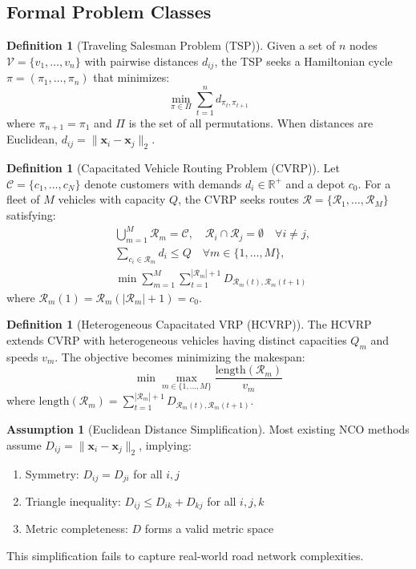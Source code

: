 \documentclass[journal,twoside,web]{ieeecolor}
\theoremstyle{definition}
\newtheorem{definition}[theorem]{Definition}
\theoremstyle{remark}
\theoremstyle{definition}
\newtheorem{assumption}[theorem]{Assumption}
\begin{document}
\subsection{Formal Problem Classes}

\begin{definition}[Traveling Salesman Problem (TSP)]
Given a set of $n$ nodes $\mathcal{V} = \{v_1, \ldots, v_n\}$ with pairwise distances $d_{ij}$, the TSP seeks a Hamiltonian cycle $\pi = (\pi_1, \ldots, \pi_n)$ that minimizes:
\begin{equation}
\min_{\pi \in \Pi} \sum_{t=1}^{n} d_{\pi_t, \pi_{t+1}}
\end{equation}
where $\pi_{n+1} = \pi_1$ and $\Pi$ is the set of all permutations. When distances are Euclidean, $d_{ij} = \|\mathbf{x}_i - \mathbf{x}_j\|_2$.
\end{definition}

\begin{definition}[Capacitated Vehicle Routing Problem (CVRP)]
Let $\mathcal{C} = \{c_1, \ldots, c_N\}$ denote customers with demands $d_i \in \mathbb{R}^+$ and a depot $c_0$. For a fleet of $M$ vehicles with capacity $Q$, the CVRP seeks routes $\mathcal{R} = \{\mathcal{R}_1, \ldots, \mathcal{R}_M\}$ satisfying:
\begin{align}
&\bigcup_{m=1}^M \mathcal{R}_m = \mathcal{C}, \quad \mathcal{R}_i \cap \mathcal{R}_j = \emptyset \quad \forall i \neq j,\\
&\sum_{c_i \in \mathcal{R}_m} d_i \leq Q \quad \forall m \in \{1,\ldots,M\},\\
&\min \sum_{m=1}^M \sum_{t=1}^{|\mathcal{R}_m|+1} D_{\mathcal{R}_m(t), \mathcal{R}_m(t+1)}
\end{align}
where $\mathcal{R}_m(1) = \mathcal{R}_m(|\mathcal{R}_m|+1) = c_0$.
\end{definition}

\begin{definition}[Heterogeneous Capacitated VRP (HCVRP)]
The HCVRP extends CVRP with heterogeneous vehicles having distinct capacities $Q_m$ and speeds $v_m$. The objective becomes minimizing the makespan:
\begin{equation}
\min \max_{m \in \{1,\ldots,M\}} \frac{\text{length}(\mathcal{R}_m)}{v_m}
\end{equation}
where $\text{length}(\mathcal{R}_m) = \sum_{t=1}^{|\mathcal{R}_m|+1} D_{\mathcal{R}_m(t), \mathcal{R}_m(t+1)}$.
\end{definition}

\begin{assumption}[Euclidean Distance Simplification]
Most existing NCO methods assume $D_{ij} = \|\mathbf{x}_i - \mathbf{x}_j\|_2$, implying:
\begin{enumerate}
\item Symmetry: $D_{ij} = D_{ji}$ for all $i,j$
\item Triangle inequality: $D_{ij} \leq D_{ik} + D_{kj}$ for all $i,j,k$
\item Metric completeness: $D$ forms a valid metric space
\end{enumerate}
This simplification fails to capture real-world road network complexities.
\end{assumption}
\end{document}
